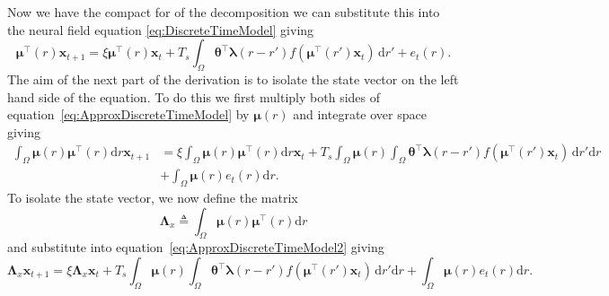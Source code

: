 \documentclass[11pt,draftcls,onecolumn,peerreview]{IEEEtran}
\begin{document}
% 
Now we have the compact for of the decomposition we can substitute this into the neural field equation \eqref{eq:DiscreteTimeModel} giving
\begin{equation}\label{eq:ApproxDiscreteTimeModel}
	\boldsymbol\mu^\top\left(r\right)\mathbf{x}_{t+1} = 
	\xi \boldsymbol\mu^\top\left(r\right)\mathbf{x}_t + 
	T_s \int_\Omega { 
	    \boldsymbol\theta^\top\boldsymbol\lambda\left(r-r'\right)
	    f\left(\boldsymbol\mu^\top\left(r'\right)\mathbf{x}_t\right) 
	\, \mathrm{d}r'}  
	+ e_t\left(r\right).
\end{equation}
The aim of the next part of the derivation is to isolate the state vector on the left hand side of the equation. To do this we first multiply both sides of equation~\eqref{eq:ApproxDiscreteTimeModel} by $\boldsymbol\mu\left(r\right)$ and integrate over space giving 
\begin{align}\label{eq:ApproxDiscreteTimeModel2}
	\int_{\Omega} \boldsymbol\mu\left(r\right)\boldsymbol\mu^\top\left(r\right) \mathrm{d}r \mathbf{x}_{t+1} &= 
	\xi \int_{\Omega}\boldsymbol\mu\left(r\right)\boldsymbol\mu^\top\left(r\right) \mathrm{d}r \mathbf{x}_t + 
	T_s \int_{\Omega}\boldsymbol\mu\left(r\right)\int_\Omega { 
	    \boldsymbol\theta^\top\boldsymbol\lambda\left(r-r'\right)
	    f\left(\boldsymbol\mu^\top\left(r'\right)\mathbf{x}_t\right) 
	\, \mathrm{d}r'\mathrm{d}r}  \nonumber\\
	&+ \int_{\Omega}\boldsymbol\mu\left(r\right)e_t\left(r\right)\mathrm{d}r.
\end{align}
To isolate the state vector, we now define the matrix 
\begin{equation}
	\label{eq:Lambdax}
	 \mathbf{\Lambda}_{x} \triangleq \int_{\Omega}\boldsymbol{\mu}\left(r\right)\boldsymbol{\mu}^\top\left(r\right) \mathrm{d}r
\end{equation}
and substitute into equation~\eqref{eq:ApproxDiscreteTimeModel2} giving
\begin{equation}\label{eq:ApproxDiscreteTimeModel3}
	\mathbf{\Lambda}_{x} \mathbf{x}_{t+1} = 
	\xi \mathbf{\Lambda}_{x} \mathbf{x}_t + 
	T_s \int_{\Omega}\boldsymbol\mu\left(r\right)\int_\Omega { 
	    \boldsymbol\theta^\top\boldsymbol\lambda\left(r-r'\right)
	    f\left(\boldsymbol\mu^\top\left(r'\right)\mathbf{x}_t\right) 
	\, \mathrm{d}r'\mathrm{d}r}  
	+ \int_{\Omega}\boldsymbol{\mu}\left(r\right) e_t\left(r\right) \mathrm{d}r.
\end{equation}
\end{document}
